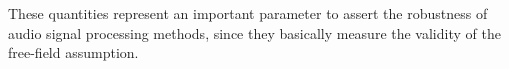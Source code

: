 These quantities represent an important parameter to assert the robustness of audio signal processing methods,
since they basically measure the validity of the free-field assumption.

